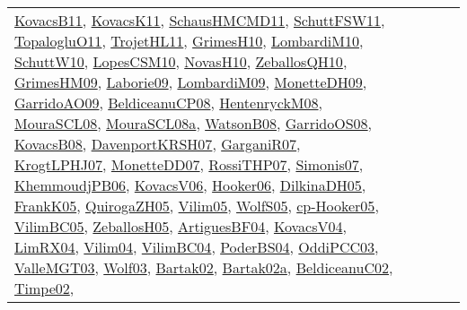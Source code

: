 {\begin{longtable}{lp{3cm}>{\raggedright}p{6cm}>{\raggedright}p{6cm}p{8cm}}
\href{articles/KovacsB11.pdf}{KovacsB11}\cite{KovacsB11}, \href{articles/KovacsK11.pdf}{KovacsK11}\cite{KovacsK11}, \href{articles/SchausHMCMD11.pdf}{SchausHMCMD11}\cite{SchausHMCMD11}, \href{articles/SchuttFSW11.pdf}{SchuttFSW11}\cite{SchuttFSW11}, \href{articles/TopalogluO11.pdf}{TopalogluO11}\cite{TopalogluO11}, \href{articles/TrojetHL11.pdf}{TrojetHL11}\cite{TrojetHL11}, \href{papers/GrimesH10.pdf}{GrimesH10}\cite{GrimesH10}, \href{papers/LombardiM10.pdf}{LombardiM10}\cite{LombardiM10}, \href{papers/SchuttW10.pdf}{SchuttW10}\cite{SchuttW10}, \href{articles/LopesCSM10.pdf}{LopesCSM10}\cite{LopesCSM10}, \href{articles/NovasH10.pdf}{NovasH10}\cite{NovasH10}, \href{articles/ZeballosQH10.pdf}{ZeballosQH10}\cite{ZeballosQH10}, \href{papers/GrimesHM09.pdf}{GrimesHM09}\cite{GrimesHM09}, \href{papers/Laborie09.pdf}{Laborie09}\cite{Laborie09}, \href{papers/LombardiM09.pdf}{LombardiM09}\cite{LombardiM09}, \href{papers/MonetteDH09.pdf}{MonetteDH09}\cite{MonetteDH09}, \href{articles/GarridoAO09.pdf}{GarridoAO09}\cite{GarridoAO09}, \href{papers/BeldiceanuCP08.pdf}{BeldiceanuCP08}\cite{BeldiceanuCP08}, \href{papers/HentenryckM08.pdf}{HentenryckM08}\cite{HentenryckM08}, \href{papers/MouraSCL08.pdf}{MouraSCL08}\cite{MouraSCL08}, \href{papers/MouraSCL08a.pdf}{MouraSCL08a}\cite{MouraSCL08a}, \href{papers/WatsonB08.pdf}{WatsonB08}\cite{WatsonB08}, \href{articles/GarridoOS08.pdf}{GarridoOS08}\cite{GarridoOS08}, \href{articles/KovacsB08.pdf}{KovacsB08}\cite{KovacsB08}, \href{papers/DavenportKRSH07.pdf}{DavenportKRSH07}\cite{DavenportKRSH07}, \href{papers/GarganiR07.pdf}{GarganiR07}\cite{GarganiR07}, \href{papers/KrogtLPHJ07.pdf}{KrogtLPHJ07}\cite{KrogtLPHJ07}, \href{papers/MonetteDD07.pdf}{MonetteDD07}\cite{MonetteDD07}, \href{papers/RossiTHP07.pdf}{RossiTHP07}\cite{RossiTHP07}, \href{articles/Simonis07.pdf}{Simonis07}\cite{Simonis07}, \href{papers/KhemmoudjPB06.pdf}{KhemmoudjPB06}\cite{KhemmoudjPB06}, \href{papers/KovacsV06.pdf}{KovacsV06}\cite{KovacsV06}, \href{articles/Hooker06.pdf}{Hooker06}\cite{Hooker06}, \href{papers/DilkinaDH05.pdf}{DilkinaDH05}\cite{DilkinaDH05}, \href{papers/FrankK05.pdf}{FrankK05}\cite{FrankK05}, \href{papers/QuirogaZH05.pdf}{QuirogaZH05}\cite{QuirogaZH05}, \href{papers/Vilim05.pdf}{Vilim05}\cite{Vilim05}, \href{papers/WolfS05.pdf}{WolfS05}\cite{WolfS05}, \href{papers/cp-Hooker05.pdf}{cp-Hooker05}\cite{cp-Hooker05}, \href{articles/VilimBC05.pdf}{VilimBC05}\cite{VilimBC05}, \href{articles/ZeballosH05.pdf}{ZeballosH05}\cite{ZeballosH05}, \href{papers/ArtiguesBF04.pdf}{ArtiguesBF04}\cite{ArtiguesBF04}, \href{papers/KovacsV04.pdf}{KovacsV04}\cite{KovacsV04}, \href{papers/LimRX04.pdf}{LimRX04}\cite{LimRX04}, \href{papers/Vilim04.pdf}{Vilim04}\cite{Vilim04}, \href{papers/VilimBC04.pdf}{VilimBC04}\cite{VilimBC04}, \href{articles/PoderBS04.pdf}{PoderBS04}\cite{PoderBS04}, \href{papers/OddiPCC03.pdf}{OddiPCC03}\cite{OddiPCC03}, \href{papers/ValleMGT03.pdf}{ValleMGT03}\cite{ValleMGT03}, \href{papers/Wolf03.pdf}{Wolf03}\cite{Wolf03}, \href{papers/Bartak02.pdf}{Bartak02}\cite{Bartak02}, \href{papers/Bartak02a.pdf}{Bartak02a}\cite{Bartak02a}, \href{papers/BeldiceanuC02.pdf}{BeldiceanuC02}\cite{BeldiceanuC02}, \href{articles/Timpe02.pdf}{Timpe02}\cite{Timpe02}, 
\end{longtable}}
